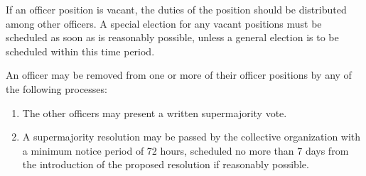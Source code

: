 \documentclass[11pt]{article}
\newcounter{h1}
\newcounter{h2}[h1]
\newcounter{h3}[h2]
\begin{document}

If an officer position is vacant, the duties of the position should be distributed among other officers. A special election for any vacant positions must be scheduled as soon as is reasonably possible, unless a general election is to be scheduled within this time period.


An officer may be removed from one or more of their officer positions by any of the following processes:

\begin{enumerate}
  \item The other officers may present a written supermajority vote.  
  \item A supermajority resolution may be passed by the collective organization with a minimum notice period of 72 hours, scheduled no more than 7 days from the introduction of the proposed resolution if reasonably possible.
\end{enumerate}


\end{document}
